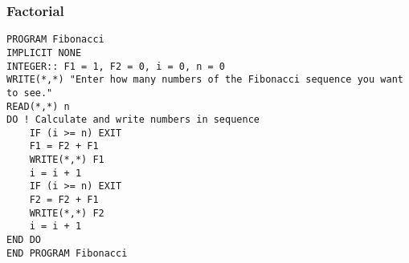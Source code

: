 \documentclass[xcolor=dvipsnames,dvip,notes=show,table]{beamer}
\begin{document}
\begin{frame}[fragile]
\frametitle{Factorial}

\scriptsize
\begin{lstlisting}
PROGRAM Fibonacci
IMPLICIT NONE
INTEGER:: F1 = 1, F2 = 0, i = 0, n = 0
WRITE(*,*) "Enter how many numbers of the Fibonacci sequence you want to see."
READ(*,*) n
DO ! Calculate and write numbers in sequence
    IF (i >= n) EXIT
    F1 = F2 + F1
    WRITE(*,*) F1
    i = i + 1
    IF (i >= n) EXIT
    F2 = F2 + F1
    WRITE(*,*) F2
    i = i + 1
END DO
END PROGRAM Fibonacci
\end{lstlisting}
\end{frame}





\end{document}
